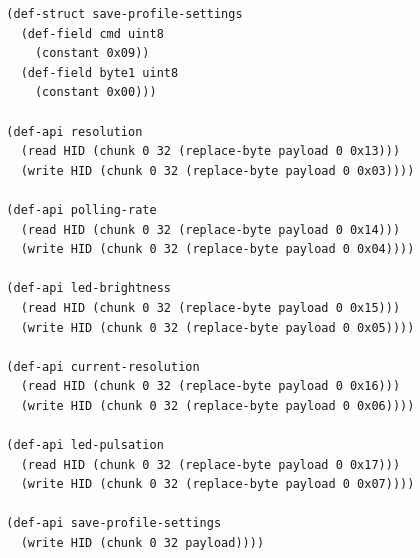 \documentclass[12pt]{article}
\begin{document}
\begin{verbatim}
  (def-struct save-profile-settings
    (def-field cmd uint8
      (constant 0x09))
    (def-field byte1 uint8
      (constant 0x00)))

  (def-api resolution
    (read HID (chunk 0 32 (replace-byte payload 0 0x13)))
    (write HID (chunk 0 32 (replace-byte payload 0 0x03))))

  (def-api polling-rate
    (read HID (chunk 0 32 (replace-byte payload 0 0x14)))
    (write HID (chunk 0 32 (replace-byte payload 0 0x04))))

  (def-api led-brightness
    (read HID (chunk 0 32 (replace-byte payload 0 0x15)))
    (write HID (chunk 0 32 (replace-byte payload 0 0x05))))

  (def-api current-resolution
    (read HID (chunk 0 32 (replace-byte payload 0 0x16)))
    (write HID (chunk 0 32 (replace-byte payload 0 0x06))))

  (def-api led-pulsation
    (read HID (chunk 0 32 (replace-byte payload 0 0x17)))
    (write HID (chunk 0 32 (replace-byte payload 0 0x07))))

  (def-api save-profile-settings
    (write HID (chunk 0 32 payload))))
\end{verbatim}
\end{document}
